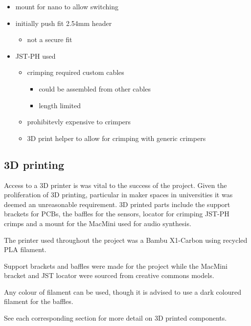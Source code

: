\begin{itemize}
\item
  mount for nano to allow switching
\item
  initially push fit 2.54mm header

  \begin{itemize}
  \item
    not a secure fit
  \end{itemize}
\item
  JST-PH used

  \begin{itemize}
  \item
    crimping required custom cables

    \begin{itemize}
    \item
      could be assembled from other cables
    \item
      length limited
    \end{itemize}
  \item
    prohibitevly expensive to crimpers
  \item
    3D print helper to allow for crimping with generic crimpers
  \end{itemize}
\end{itemize}

\subsection{3D printing}\label{d-printing}

Access to a 3D printer is was vital to the success of the project. Given
the proliferation of 3D printing, particular in maker spaces in
universities it was deemed an unreasonable requirement. 3D printed parts
include the support brackets for PCBs, the baffles for the sensors,
locator for crimping JST-PH crimps and a mount for the MacMini used for
audio synthesis.

The printer used throughout the project was a Bambu X1-Carbon using
recycled PLA filament.

Support brackets and baffles were made for the project while the MacMini
bracket and JST locator were sourced from creative commons models.

Any colour of filament can be used, though it is advised to use a dark
coloured filament for the baffles.

See each corresponding section for more detail on 3D printed components.

